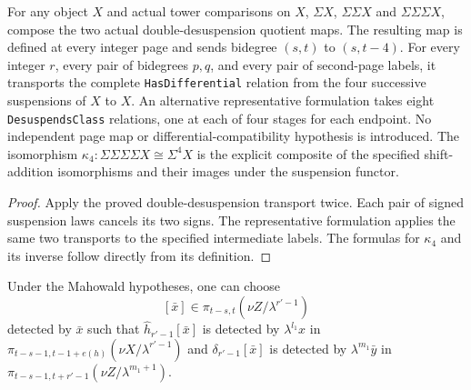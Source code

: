 \begin{lemma}
  \label{lem:adams-four-suspension-differential}
  \leanok
  For any object $X$ and actual tower comparisons on $X$, $\Sigma X$,
  $\Sigma\Sigma X$ and $\Sigma\Sigma\Sigma X$, compose the two actual
  double-desuspension quotient maps. The resulting map is defined at
  every integer page and sends bidegree $(s,t)$ to $(s,t-4)$.
  For every integer $r$, every pair of bidegrees $p,q$, and every pair
  of second-page labels, it transports the complete
  \texttt{HasDifferential} relation from the four successive suspensions
  of $X$ to $X$.
  An alternative representative formulation takes eight
  \texttt{DesuspendsClass} relations, one at each of four stages for
  each endpoint. No independent page map or differential-compatibility
  hypothesis is introduced.
  The isomorphism $\kappa_4:\Sigma\Sigma\Sigma\Sigma X\cong\Sigma^4X$
  is the explicit composite of the specified shift-addition isomorphisms
  and their images under the suspension functor.
\end{lemma}
\begin{proof}
  \leanok
  Apply the proved double-desuspension transport twice. Each pair of
  signed suspension laws cancels its two signs. The representative
  formulation applies the same two transports to the specified
  intermediate labels. The formulas for $\kappa_4$ and its inverse
  follow directly from its definition.
\end{proof}

\begin{lemma}
  \label{lem:mahowald-synchronized-representatives}
  \notready
  Under the Mahowald hypotheses, one can choose
  \[
    [\bar x]\in\pi_{t-s,t}(\nu Z/\lambda^{r'-1})
  \]
  detected by $\bar x$ such that
  $\widehat h_{r'-1}[\bar x]$ is detected by
  $\lambda^{l_1}x$ in
  $\pi_{t-s-1,t-1+e(h)}(\nu X/\lambda^{r'-1})$ and
  $\delta_{r'-1}[\bar x]$ is detected by
  $\lambda^{m_1}\bar y$ in
  $\pi_{t-s-1,t+r'-1}(\nu Z/\lambda^{m_1+1})$.
\end{lemma}

